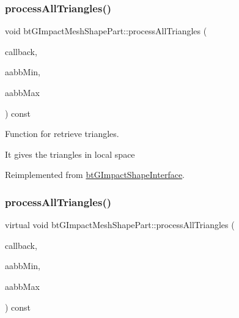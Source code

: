 \mbox{\label{classbtGImpactMeshShapePart_a040a65abd0627d83ecd8bb73be43383e}} 
\subsubsection{\texorpdfstring{process\+All\+Triangles()}{processAllTriangles()}\hspace{0.1cm}{\footnotesize\ttfamily [1/2]}}
{\footnotesize\ttfamily void bt\+G\+Impact\+Mesh\+Shape\+Part\+::process\+All\+Triangles (\begin{DoxyParamCaption}\item[{\hyperlink{classbtTriangleCallback}{bt\+Triangle\+Callback} $\ast$}]{callback,  }\item[{const bt\+Vector3 \&}]{aabb\+Min,  }\item[{const bt\+Vector3 \&}]{aabb\+Max }\end{DoxyParamCaption}) const\hspace{0.3cm}{\ttfamily [virtual]}}



Function for retrieve triangles. 

It gives the triangles in local space 

Reimplemented from \hyperlink{classbtGImpactShapeInterface_ae1dc14b29f49fc0262be72dbe9d7b75b}{bt\+G\+Impact\+Shape\+Interface}.

\mbox{\label{classbtGImpactMeshShapePart_a85befbcefc4db8ce35db58dc1965d512}} 
\subsubsection{\texorpdfstring{process\+All\+Triangles()}{processAllTriangles()}\hspace{0.1cm}{\footnotesize\ttfamily [2/2]}}
{\footnotesize\ttfamily virtual void bt\+G\+Impact\+Mesh\+Shape\+Part\+::process\+All\+Triangles (\begin{DoxyParamCaption}\item[{\hyperlink{classbtTriangleCallback}{bt\+Triangle\+Callback} $\ast$}]{callback,  }\item[{const bt\+Vector3 \&}]{aabb\+Min,  }\item[{const bt\+Vector3 \&}]{aabb\+Max }\end{DoxyParamCaption}) const\hspace{0.3cm}{\ttfamily [virtual]}}



